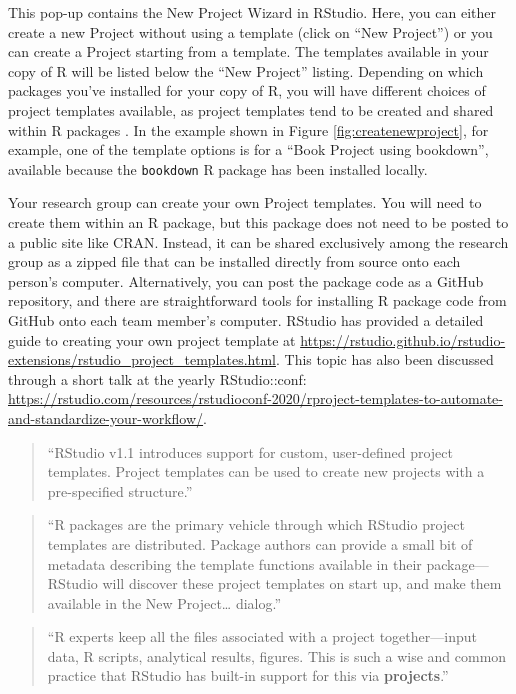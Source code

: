\documentclass[]{tufte-book}
\begin{document}
This pop-up contains the New Project Wizard in RStudio. Here, you can either
create a new Project without using a template (click on ``New Project'') or you
can create a Project starting from a template. The templates available in your
copy of R will be listed below the ``New Project'' listing. Depending on which
packages you've installed for your copy of R, you will have different choices of
project templates available, as project templates tend to be created and shared
within R packages \citep{rstudioprojecttemplate}. In the example shown in
Figure \ref{fig:createnewproject}, for example, one of the template options is
for a ``Book Project using bookdown'', available because the \texttt{bookdown} R package
has been installed locally.

Your research group can create your own Project templates. You will need to
create them within an R package, but this package does not need to be posted to
a public site like CRAN. Instead, it can be shared exclusively among the
research group as a zipped file that can be installed directly from source onto
each person's computer. Alternatively, you can post the package code as a GitHub
repository, and there are straightforward tools for installing R package code
from GitHub onto each team member's computer. RStudio has provided a
detailed guide to creating your own project template at
\url{https://rstudio.github.io/rstudio-extensions/rstudio_project_templates.html}.
This topic has also been discussed through a short talk at the
yearly RStudio::conf: \url{https://rstudio.com/resources/rstudioconf-2020/rproject-templates-to-automate-and-standardize-your-workflow/}.

\begin{quote}
``RStudio v1.1 introduces support for custom, user-defined project templates.
Project templates can be used to create new projects with a pre-specified
structure.'' \citep{rstudioprojecttemplate}
\end{quote}

\begin{quote}
``R packages are the primary vehicle through which RStudio project templates
are distributed. Package authors can provide a small bit of metadata describing
the template functions available in their package---RStudio will discover these
project templates on start up, and make them available in the New Project\ldots{}
dialog.'' \citep{rstudioprojecttemplate}
\end{quote}

\begin{quote}
``R experts keep all the files associated with a project together---input data,
R scripts, analytical results, figures. This is such a wise and common practice
that RStudio has built-in support for this via \textbf{projects}.'' \citep{wickham2016r}
\end{quote}
\end{document}
